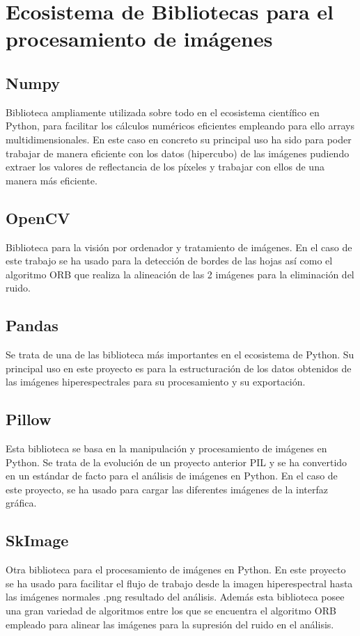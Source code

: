 \section{Ecosistema de Bibliotecas para el procesamiento de imágenes}

    \subsection{Numpy}
Biblioteca ampliamente utilizada sobre todo en el ecosistema científico en Python, para facilitar los cálculos numéricos eficientes empleando para ello arrays  multidimensionales. En este caso en concreto su principal uso ha sido para poder trabajar de manera eficiente con los datos (hipercubo) de las imágenes pudiendo extraer los valores de reflectancia de los píxeles y trabajar con ellos de una manera más eficiente\cite{Harris2020NumPy}.


\subsection{OpenCV}
Biblioteca para la visión por ordenador y tratamiento de imágenes. En el caso de este trabajo se ha usado para la detección de bordes de las hojas así como el algoritmo ORB que realiza la alineación de las 2 imágenes para la eliminación del ruido\cite{Bradski2000OpenCV}.

\subsection{Pandas}
Se trata de una de las biblioteca más importantes en el ecosistema de Python. Su principal uso en este proyecto es para la estructuración de los datos obtenidos de las imágenes hiperespectrales para su procesamiento y su exportación\cite{McKinney2010Pandas}.

\subsection{Pillow} 
Esta biblioteca se basa en la manipulación y procesamiento de imágenes en Python. Se trata de la evolución de un proyecto anterior PIL y se ha convertido en un estándar de facto para el análisis de imágenes en Python. En el caso de este proyecto, se ha usado para cargar las diferentes imágenes de la interfaz gráfica\cite{Pillow}. 

\subsection{SkImage}
Otra biblioteca para el procesamiento de imágenes en Python. En este proyecto se ha usado para facilitar el flujo de trabajo desde la imagen hiperespectral hasta las imágenes normales .png resultado del análisis.
Además esta biblioteca posee una gran variedad de algoritmos entre los que se encuentra el algoritmo ORB empleado para alinear las imágenes para la supresión del ruido en el análisis\cite{vanderWalt2014ScikitImage}.


